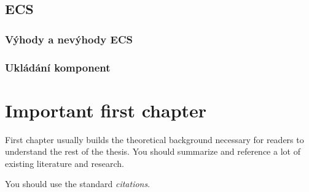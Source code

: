 \section{ECS}
\subsection{Výhody a nevýhody ECS}
\subsection{Ukládání komponent}




























\iffalse
\chapter{Important first chapter}
\label{chap:refs}

First chapter usually builds the theoretical background necessary for readers to understand the rest of the thesis. You should summarize and reference a lot of existing literature and research.

You should use the standard \emph{citations}.

